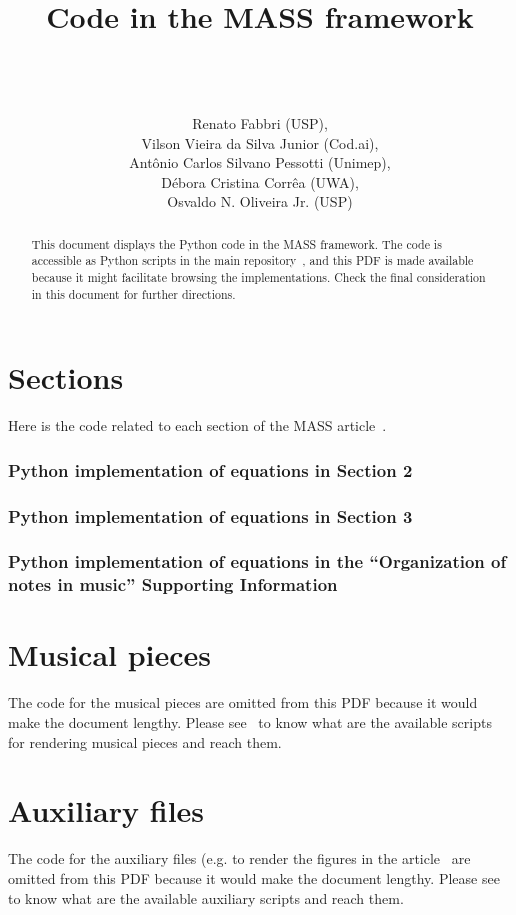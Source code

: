 \documentclass{article}
\newcommand{\code}[2]{





 \subsubsection*{#1}
 
}
\begin{document}
\title{Code in the MASS framework}
\author{\\\\\\ Renato Fabbri (USP),\\
Vilson Vieira da Silva Junior (Cod.ai),\\
Ant\^onio Carlos Silvano Pessotti (Unimep),\\
D\'ebora Cristina Corr\^ea (UWA),\\
Osvaldo N. Oliveira Jr. (USP)
}

\maketitle

\begin{abstract}
This document displays the Python code in the MASS
framework.
The code is accessible as Python scripts in the main repository~\cite{massRepo},
and this PDF is made available because it might facilitate
browsing the implementations.
Check the final consideration in this document for further directions.
\end{abstract}

\section{Sections}
Here is the code related to each section of the MASS article~\cite{massArticle}.

% 
\code{Python implementation of equations in Section 2}{../src/sections/2.py}

\clearpage
\code{Python implementation of equations in Section 3}{../src/sections/3.py}

\clearpage
\code{Python implementation of equations in the ``Organization of notes in music'' Supporting Information~\cite{massNotesInMusic}}{../src/sections/SIA.py}

\clearpage
\section{Musical pieces}
The code for the musical pieces are omitted from this PDF because
it would make the document lengthy.
Please see~\cite{massRepo,massListings}
to know what are the available scripts for rendering musical pieces
and reach them.

\section{Auxiliary files}
The code for the auxiliary files (e.g. to render the figures in the article~\cite{massArticle}
are omitted from this PDF because
it would make the document lengthy.
Please see~\cite{massRepo,massListings}
to know what are the available auxiliary scripts
and reach them.
\end{document}
